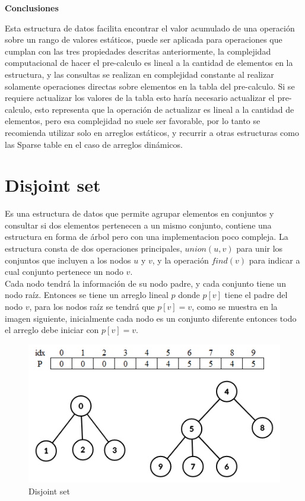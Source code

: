 \documentclass[12pt, a4paper]{article}
\newcommand{\subtitulo}[1]{\begin{center}\textbf{#1}\end{center}}
\begin{document}
	\subtitulo{Conclusiones}
	Esta estructura de datos facilita encontrar el valor acumulado de una operación sobre un rango de valores 
	estáticos, puede ser aplicada para operaciones que cumplan con las tres propiedades descritas
	anteriormente, la complejidad computacional de hacer el pre-calculo es lineal a la cantidad de
	elementos en la estructura, y las consultas se realizan en complejidad constante al realizar solamente operaciones
	directas sobre elementos en la tabla del pre-calculo. Si se requiere actualizar los valores de la tabla esto
	haría necesario actualizar el pre-calculo, esto representa que la operación de actualizar es lineal a la 
	cantidad de elementos, pero esa complejidad no suele ser favorable, por lo tanto se recomienda utilizar solo 
	en arreglos estáticos, y recurrir a otras estructuras como las Sparse table en el caso de arreglos dinámicos.
	
	\section{Disjoint set}
	Es una estructura de datos que permite agrupar elementos en conjuntos y consultar si dos elementos
	pertenecen a un mismo conjunto, contiene una estructura en forma de árbol pero con una implementacion poco
	compleja. La estructura consta de dos operaciones principales, $union(u, v)$ para unir los conjuntos que incluyen 
	a los nodos $u$ y $v$, y la operación $find(v)$ para indicar a cual conjunto pertenece un nodo $v$.\\
	
	Cada nodo tendrá la información de su nodo padre, y cada conjunto tiene un nodo raíz. Entonces se tiene un 
	arreglo lineal $p$ donde $p[v]$ tiene el padre del nodo $v$, para los nodos raíz se tendrá que $p[v]=v$, 
	como se muestra en la imagen siguiente, inicialmente cada nodo es un conjunto diferente entonces todo el arreglo 
	debe iniciar con $p[v]=v$.
	
	\begin{figure}[h!]
		\centering
		\includegraphics[scale=0.7]{Estructuras_de_datos/imagenes/disjoint_set/construccion}
		\caption{Disjoint set}
		\label{estructuras:disjoint_set:construccion}
	\end{figure}
	
\end{document}
